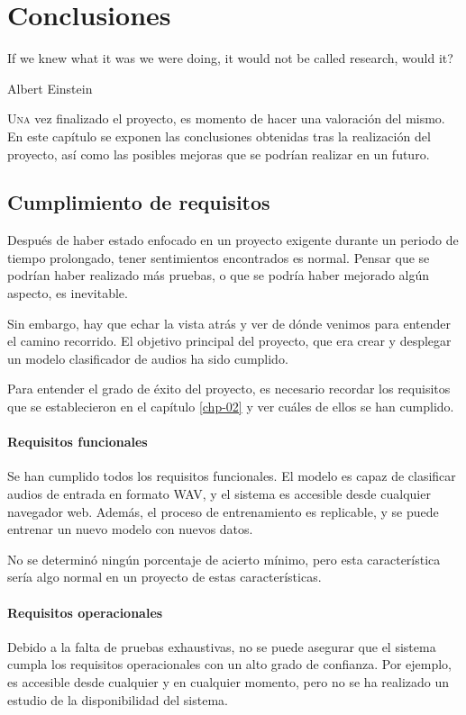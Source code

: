 \chapter{Conclusiones}\label{chp-04}

\epigraph{If we knew what it was we were doing, it would not be called research, would it?}{Albert Einstein}

\lettrine[lraise=-0.1, lines=2, loversize=0.2]{U}{na} vez finalizado el proyecto, es momento de hacer una valoración del mismo. 
En este capítulo se exponen las conclusiones obtenidas tras la realización del proyecto, así como las posibles mejoras que se podrían realizar en un futuro.

\section{Cumplimiento de requisitos}
Después de haber estado enfocado en un proyecto exigente durante un periodo de tiempo prolongado, tener sentimientos encontrados es normal. 
Pensar que se podrían haber realizado más pruebas, o que se podría haber mejorado algún aspecto, es inevitable.

Sin embargo, hay que echar la vista atrás y ver de dónde venimos para entender el camino recorrido.
El objetivo principal del proyecto, que era crear y desplegar un modelo clasificador de audios ha sido cumplido.

Para entender el grado de éxito del proyecto, es necesario recordar los requisitos que se establecieron en el capítulo \ref{chp-02} y ver cuáles de ellos se han cumplido.

\subsubsection{Requisitos funcionales}
Se han cumplido todos los requisitos funcionales.
El modelo es capaz de clasificar audios de entrada en formato WAV, y el sistema es accesible desde cualquier navegador web.
Además, el proceso de entrenamiento es replicable, y se puede entrenar un nuevo modelo con nuevos datos.

No se determinó ningún porcentaje de acierto mínimo, pero esta característica sería algo normal en un proyecto de estas características.

\subsubsection{Requisitos operacionales}
Debido a la falta de pruebas exhaustivas, no se puede asegurar que el sistema cumpla los requisitos operacionales con un alto grado de confianza.
Por ejemplo, es accesible desde cualquier y en cualquier momento, pero no se ha realizado un estudio de la disponibilidad del sistema.

